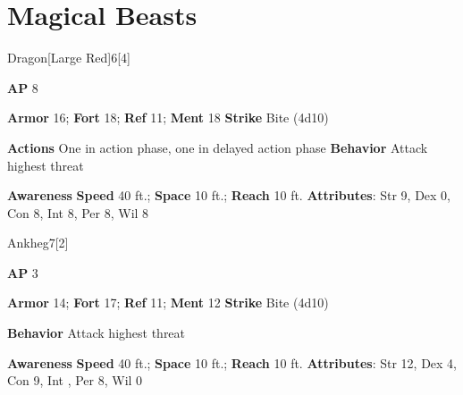 \section{Magical Beasts}
\begin{monsection}{Dragon}[Large Red]{6}[4]
\vspace{-1em}\vspace{-1em}
\begin{spellcontent}
\begin{spelltargetinginfo}
{\textbf{AP} 8}

\pari \textbf{Armor} 16;
\textbf{Fort} 18;
\textbf{Ref} 11;
\textbf{Ment} 18
\pari \textbf{Strike} Bite  (4d10)


\pari \textbf{Actions} One in action phase, one in delayed action phase
\pari \textbf{Behavior} Attack highest threat
\end{spelltargetinginfo}
\end{spellcontent}

\begin{monsterfooter}
\pari \textbf{Awareness} 
\pari \textbf{Speed} 40 ft.;
\textbf{Space} 10 ft.;
\textbf{Reach} 10 ft.
\pari \textbf{Attributes}:
Str 9,
Dex 0,
Con 8,
Int 8,
Per 8,
Wil 8
\end{monsterfooter}
\end{monsection}

\begin{monsection}{Ankheg}{7}[2]
\vspace{-1em}\vspace{-1em}
\begin{spellcontent}
\begin{spelltargetinginfo}
{\textbf{AP} 3}

\pari \textbf{Armor} 14;
\textbf{Fort} 17;
\textbf{Ref} 11;
\textbf{Ment} 12
\pari \textbf{Strike} Bite  (4d10)



\pari \textbf{Behavior} Attack highest threat
\end{spelltargetinginfo}
\end{spellcontent}

\begin{monsterfooter}
\pari \textbf{Awareness} 
\pari \textbf{Speed} 40 ft.;
\textbf{Space} 10 ft.;
\textbf{Reach} 10 ft.
\pari \textbf{Attributes}:
Str 12,
Dex 4,
Con 9,
Int ,
Per 8,
Wil 0
\end{monsterfooter}
\end{monsection}



